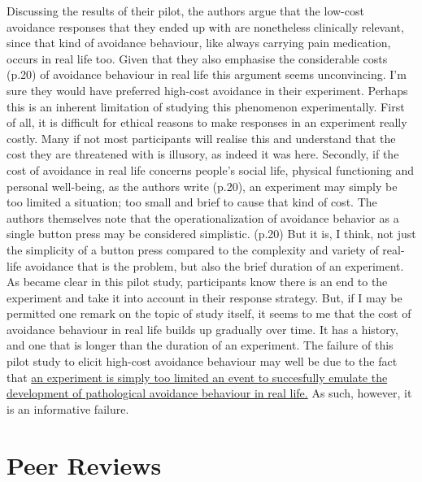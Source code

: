 \documentclass[twocolumn, serif, authordate, review]{jote-article}
\begin{document}
Discussing the results of their pilot, the authors argue that the low-cost avoidance responses that they ended up with are nonetheless clinically relevant, since that kind of avoidance behaviour, like always carrying pain medication, occurs in real life too. Given that they also emphasise the {\textquotedbl}considerable costs{\textquotedbl} (p.20) of avoidance behaviour in real life this argument seems unconvincing. I'm sure they would have preferred high-cost avoidance in their experiment. Perhaps this is an inherent limitation of studying this phenomenon experimentally. First of all, it is difficult for ethical reasons to make responses in an experiment really costly. Many if not most participants will realise this and understand that the cost they are threatened with is illusory, as indeed it was here. Secondly, if the cost of avoidance in real life concerns people's {\textquotedbl}social life, physical functioning and personal well-being{\textquotedbl}, as the authors write (p.20), an experiment may simply be too limited a situation; too small and brief to cause that kind of cost. The authors themselves note that {\textquotedbl}the operationalization of avoidance behavior as a single button press may be considered simplistic.{\textquotedbl} (p.20) But it is, I think, not just the simplicity of a button press compared to the complexity and variety of real-life avoidance that is the problem, but also the brief duration of an experiment. As became clear in this pilot study, participants know there is an end to the experiment and take it into account in their response strategy. But, if I may be permitted one remark on the topic of study itself, it seems to me that the cost of avoidance behaviour in real life builds up gradually over time. It has a history, and one that is longer than the duration of an experiment. The failure of this pilot study to elicit high-cost avoidance behaviour may well be due to the fact that \hyperref[sec:reviews]{an experiment is simply too limited an event to succesfully emulate the development of pathological avoidance behaviour in real life.} As such, however, it is an informative failure.
\label{sec:limit}

\newpage

{}
\section*{Peer Reviews}
\label{sec:reviews}
\end{document}
